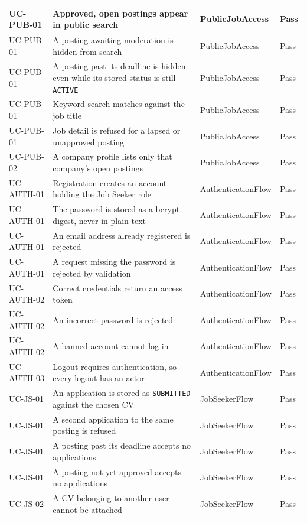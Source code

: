 \begin{longtable}{|>{\raggedright\arraybackslash}p{2.0cm}|>{\raggedright\arraybackslash}p{5.7cm}|>{\raggedright\arraybackslash}p{4.6cm}|>{\raggedright\arraybackslash}p{1.4cm}|}
	UC-PUB-01 & Approved, open postings appear in public search & PublicJobAccess & Pass \\
	\hline
	UC-PUB-01 & A posting awaiting moderation is hidden from search & PublicJobAccess & Pass \\
	\hline
	UC-PUB-01 & A posting past its deadline is hidden even while its stored status is still \texttt{ACTIVE} & PublicJobAccess & Pass \\
	\hline
	UC-PUB-01 & Keyword search matches against the job title & PublicJobAccess & Pass \\
	\hline
	UC-PUB-01 & Job detail is refused for a lapsed or unapproved posting & PublicJobAccess & Pass \\
	\hline
	UC-PUB-02 & A company profile lists only that company's open postings & PublicJobAccess & Pass \\
	\hline
	UC-AUTH-01 & Registration creates an account holding the Job Seeker role & AuthenticationFlow & Pass \\
	\hline
	UC-AUTH-01 & The password is stored as a bcrypt digest, never in plain text & AuthenticationFlow & Pass \\
	\hline
	UC-AUTH-01 & An email address already registered is rejected & AuthenticationFlow & Pass \\
	\hline
	UC-AUTH-01 & A request missing the password is rejected by validation & AuthenticationFlow & Pass \\
	\hline
	UC-AUTH-02 & Correct credentials return an access token & AuthenticationFlow & Pass \\
	\hline
	UC-AUTH-02 & An incorrect password is rejected & AuthenticationFlow & Pass \\
	\hline
	UC-AUTH-02 & A banned account cannot log in & AuthenticationFlow & Pass \\
	\hline
	UC-AUTH-03 & Logout requires authentication, so every logout has an actor & AuthenticationFlow & Pass \\
	\hline
	UC-JS-01 & An application is stored as \texttt{SUBMITTED} against the chosen CV & JobSeekerFlow & Pass \\
	\hline
	UC-JS-01 & A second application to the same posting is refused & JobSeekerFlow & Pass \\
	\hline
	UC-JS-01 & A posting past its deadline accepts no applications & JobSeekerFlow & Pass \\
	\hline
	UC-JS-01 & A posting not yet approved accepts no applications & JobSeekerFlow & Pass \\
	\hline
	UC-JS-02 & A CV belonging to another user cannot be attached & JobSeekerFlow & Pass \\

\end{longtable}
